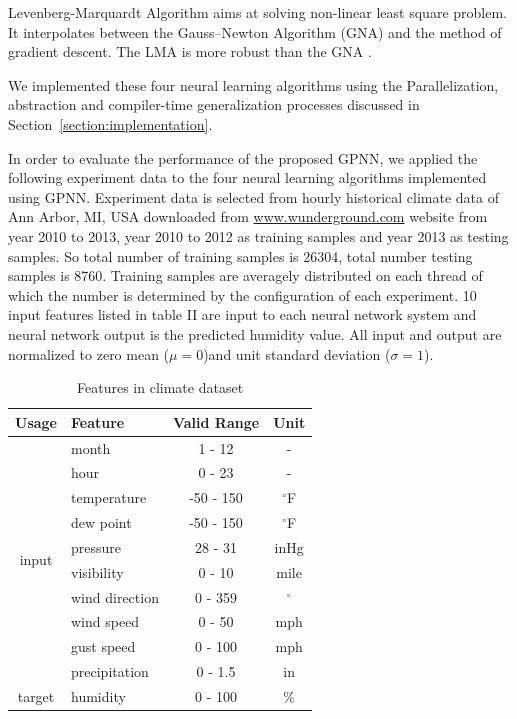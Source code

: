\documentclass[procedia]{easychair}
\begin{document}
Levenberg-Marquardt Algorithm aims at solving non-linear least square problem.  It interpolates between the Gauss–Newton Algorithm (GNA) and the method of gradient descent. The LMA is more robust than the GNA  \cite{hagan1994training}.

We implemented these four neural learning algorithms using the Parallelization, abstraction and compiler-time generalization processes discussed in Section~\ref{section:implementation}.

In order to evaluate the performance of the proposed GPNN, we applied the following experiment data to the four neural learning algorithms implemented using GPNN. Experiment data is selected from hourly historical climate data of Ann Arbor, MI, USA downloaded from \url{www.wunderground.com} website from year 2010 to 2013, year 2010 to 2012 as training samples and year 2013 as testing samples.  So total number of training samples is 26304, total number testing samples is 8760.  Training samples are averagely distributed on each thread of which the number is determined by the configuration of each experiment.  10 input features listed in table II are input to each neural network system and neural network output is the predicted humidity value.  All input and output are normalized to zero mean ($ \mu = 0 $)and unit standard deviation ($ \sigma = 1 $).

\begin{table}[htp]
    \centering
    \caption{Features in climate dataset}
    \begin{tabular}{ c l c c }
        \hline \hline
        Usage & Feature & Valid Range & Unit \\
        \hline
        \multirow{10}{*}{input}
            & month & 1 - 12 & - \\
            & hour & 0 - 23 & - \\
            & temperature & -50 - 150 & \(^\circ\)F \\
            & dew point & -50 - 150 & \(^\circ\)F \\
            & pressure & 28 - 31 & inHg \\
            & visibility & 0 - 10 & mile \\
            & wind direction & 0 - 359 & \(^\circ\) \\
            & wind speed & 0 - 50 & mph \\
            & gust speed & 0 - 100 & mph \\
            & precipitation & 0 - 1.5 & in \\
        \hline
        target & humidity & 0 - 100 & \% \\
        \hline \hline
    \end{tabular}
    \label{table:climate}
\end{table}
\end{document}
